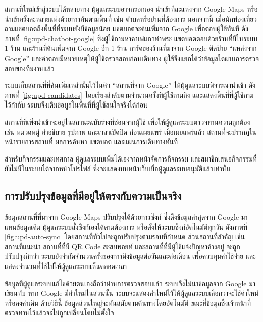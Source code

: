 สถานที่ใหม่เข้าสู่ระบบได้หลายทาง ผู้ดูแลระบบอาจกรอกเอง นำเข้าทีละแห่งจาก Google Maps หรือนำเข้าครั้งละหลายแห่งด้วยการค้นตามพื้นที่ เช่น ตำบลหรือย่านที่ต้องการ นอกจากนี้ เมื่อนักท่องเที่ยวถามแชตบอตถึงพื้นที่ที่ระบบยังมีข้อมูลน้อย แชตบอตจะค้นเพิ่มจาก Google เพื่อตอบผู้ใช้ทันที ดังภาพที่ \ref{fig:upd-chatbot-google} ซึ่งผู้ใช้ถามหาคาเฟ่แถวท่าพระ แชตบอตตอบด้วยร้านที่มีในระบบ 1 ร้าน และร้านที่ค้นเพิ่มจาก Google อีก 1 ร้าน การ์ดของร้านที่มาจาก Google ติดป้าย ``แหล่งจาก Google'' และคำตอบมีหมายเหตุให้ผู้ใช้ตรวจสอบก่อนเดินทาง ผู้ใช้จึงแยกได้ว่าข้อมูลใดผ่านการตรวจสอบของทีมงานแล้ว


ระบบเก็บสถานที่ที่ค้นเพิ่มเหล่านั้นไว้ในคิว ``สถานที่จาก Google'' ให้ผู้ดูแลระบบพิจารณานำเข้า ดังภาพที่ \ref{fig:upd-candidates} โดยเรียงลำดับตามจำนวนครั้งที่ผู้ใช้ถามถึง และแสดงพื้นที่ที่ผู้ใช้ถามไว้กำกับ ระบบจึงเติมข้อมูลในพื้นที่ที่ผู้ใช้สนใจจริงได้ก่อน


สถานที่ที่เพิ่งนำเข้าจะอยู่ในสถานะฉบับร่างที่ซ่อนจากผู้ใช้ เพื่อให้ผู้ดูแลระบบตรวจทานความถูกต้อง เช่น หมวดหมู่ คำอธิบาย รูปภาพ และเวลาเปิดปิด ก่อนเผยแพร่ เมื่อเผยแพร่แล้ว สถานที่จะปรากฏในหน้ารายการสถานที่ ผลการค้นหา แชตบอต และแผนการเดินทางทันที

สำหรับกิจกรรมและเทศกาล ผู้ดูแลระบบเพิ่มได้เองจากหน้าจัดการกิจกรรม และสมาชิกเสนอกิจกรรมที่ยังไม่มีในระบบได้จากหน้าโปรไฟล์ ซึ่งจะแสดงบนหน้าเว็บเมื่อผู้ดูแลระบบอนุมัติแล้วเท่านั้น

\subsection{การปรับปรุงข้อมูลที่มีอยู่ให้ตรงกับความเป็นจริง}

ข้อมูลสถานที่ที่มาจาก Google Maps ปรับปรุงได้ด้วยการซิงก์ ซึ่งดึงข้อมูลล่าสุดจาก Google มาแทนข้อมูลเดิม ผู้ดูแลระบบสั่งซิงก์เองได้ตามต้องการ หรือตั้งให้ระบบซิงก์อัตโนมัติทุกวัน ดังภาพที่ \ref{fig:upd-auto-sync} โดยสถานที่ทั่วไปจะถูกปรับปรุงตามรอบที่กำหนด ส่วนสถานที่สำคัญ เช่น สถานที่แนะนำ สถานที่ที่มี QR Code สะสมพอยท์ และสถานที่ที่มีผู้ใช้แจ้งปัญหาค้างอยู่ จะถูกปรับปรุงถี่กว่า ระบบยังจำกัดจำนวนครั้งของการดึงข้อมูลต่อวันและต่อเดือน เพื่อควบคุมค่าใช้จ่าย และแสดงจำนวนที่ใช้ไปให้ผู้ดูแลระบบเห็นตลอดเวลา


ข้อมูลที่ผู้ดูแลระบบแก้ไขด้วยตนเองถือว่าผ่านการตรวจสอบแล้ว ระบบจึงไม่นำข้อมูลจาก Google มาเขียนทับ หาก Google มีค่าใหม่ในส่วนนั้น ระบบจะแสดงค่าใหม่ไว้ให้ผู้ดูแลระบบเลือกว่าจะใช้ค่าใหม่หรือคงค่าเดิม ด้วยวิธีนี้ ข้อมูลส่วนใหญ่จะทันสมัยตามต้นทางโดยอัตโนมัติ ขณะที่ข้อมูลซึ่งเจ้าหน้าที่ตรวจทานไว้แล้วจะไม่ถูกเปลี่ยนโดยไม่ตั้งใจ


